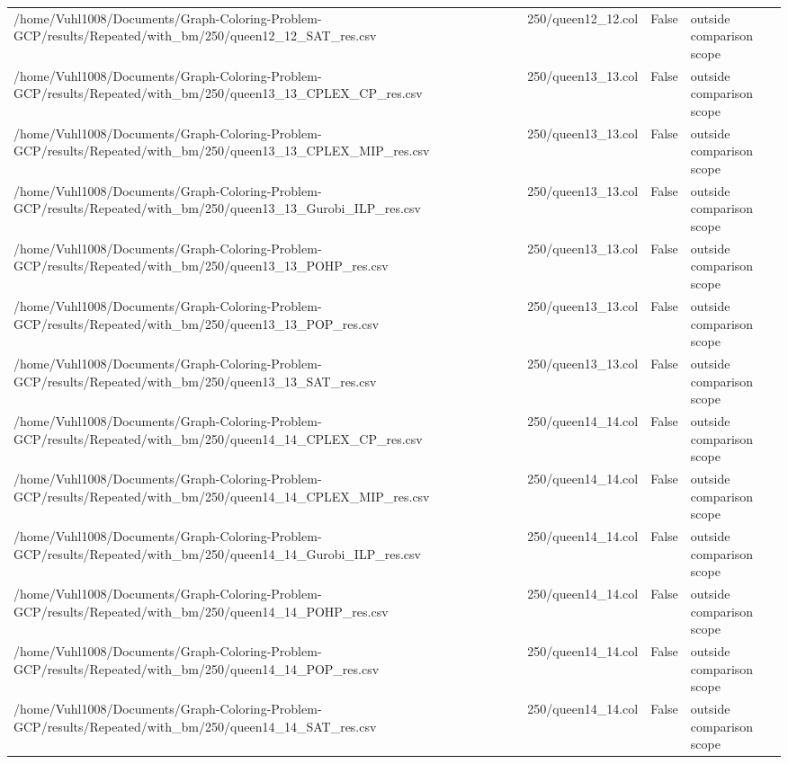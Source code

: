 \begin{table}[htbp]
\begin{tabular}{llll}
/home/Vuhl1008/Documents/Graph-Coloring-Problem-GCP/results/Repeated/with\_bm/250/queen12\_12\_SAT\_res.csv & 250/queen12\_12.col & False & outside comparison scope \\
/home/Vuhl1008/Documents/Graph-Coloring-Problem-GCP/results/Repeated/with\_bm/250/queen13\_13\_CPLEX\_CP\_res.csv & 250/queen13\_13.col & False & outside comparison scope \\
/home/Vuhl1008/Documents/Graph-Coloring-Problem-GCP/results/Repeated/with\_bm/250/queen13\_13\_CPLEX\_MIP\_res.csv & 250/queen13\_13.col & False & outside comparison scope \\
/home/Vuhl1008/Documents/Graph-Coloring-Problem-GCP/results/Repeated/with\_bm/250/queen13\_13\_Gurobi\_ILP\_res.csv & 250/queen13\_13.col & False & outside comparison scope \\
/home/Vuhl1008/Documents/Graph-Coloring-Problem-GCP/results/Repeated/with\_bm/250/queen13\_13\_POHP\_res.csv & 250/queen13\_13.col & False & outside comparison scope \\
/home/Vuhl1008/Documents/Graph-Coloring-Problem-GCP/results/Repeated/with\_bm/250/queen13\_13\_POP\_res.csv & 250/queen13\_13.col & False & outside comparison scope \\
/home/Vuhl1008/Documents/Graph-Coloring-Problem-GCP/results/Repeated/with\_bm/250/queen13\_13\_SAT\_res.csv & 250/queen13\_13.col & False & outside comparison scope \\
/home/Vuhl1008/Documents/Graph-Coloring-Problem-GCP/results/Repeated/with\_bm/250/queen14\_14\_CPLEX\_CP\_res.csv & 250/queen14\_14.col & False & outside comparison scope \\
/home/Vuhl1008/Documents/Graph-Coloring-Problem-GCP/results/Repeated/with\_bm/250/queen14\_14\_CPLEX\_MIP\_res.csv & 250/queen14\_14.col & False & outside comparison scope \\
/home/Vuhl1008/Documents/Graph-Coloring-Problem-GCP/results/Repeated/with\_bm/250/queen14\_14\_Gurobi\_ILP\_res.csv & 250/queen14\_14.col & False & outside comparison scope \\
/home/Vuhl1008/Documents/Graph-Coloring-Problem-GCP/results/Repeated/with\_bm/250/queen14\_14\_POHP\_res.csv & 250/queen14\_14.col & False & outside comparison scope \\
/home/Vuhl1008/Documents/Graph-Coloring-Problem-GCP/results/Repeated/with\_bm/250/queen14\_14\_POP\_res.csv & 250/queen14\_14.col & False & outside comparison scope \\
/home/Vuhl1008/Documents/Graph-Coloring-Problem-GCP/results/Repeated/with\_bm/250/queen14\_14\_SAT\_res.csv & 250/queen14\_14.col & False & outside comparison scope \\

\end{tabular}
\end{table}

